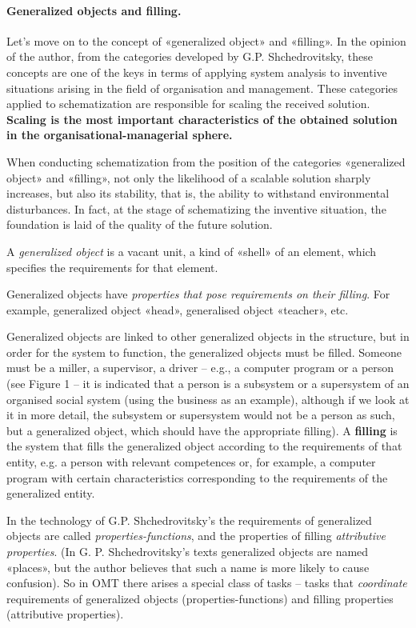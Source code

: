 \documentclass[11pt,a4paper]{book}
\begin{document}
\paragraph{Generalized objects and filling.}

Let's move on to the concept of «generalized object» and «filling». In the
opinion of the author, from the categories developed by G.P. Shchedrovitsky,
these concepts are one of the keys in terms of applying system analysis to
inventive situations arising in the field of organisation and management.
These categories applied to schematization are responsible for scaling the
received solution.  \textbf{Scaling is the most important characteristics of
  the obtained solution in the organisational-managerial sphere.}

When conducting schematization from the position of the categories
«generalized object» and «filling», not only the likelihood of a scalable
solution sharply increases, but also its stability, that is, the ability to
withstand environmental disturbances. In fact, at the stage of schematizing
the inventive situation, the foundation is laid of the quality of the future
solution.

A \emph{generalized object} is a vacant unit, a kind of «shell» of an element,
which specifies the requirements for that element.

Generalized objects have \emph{properties that pose requirements on their
  filling}. For example, generalized object «head», generalised object
«teacher», etc.

Generalized objects are linked to other generalized objects in the structure,
but in order for the system to function, the generalized objects must be
filled.  Someone must be a miller, a supervisor, a driver -- e.g., a computer
program or a person (see Figure 1 -- it is indicated that a person is a
subsystem or a supersystem of an organised social system (using the business
as an example), although if we look at it in more detail, the subsystem or
supersystem would not be a person as such, but a generalized object, which
should have the appropriate filling). A \textbf{filling} is the system that
fills the generalized object according to the requirements of that entity,
e.g. a person with relevant competences or, for example, a computer program
with certain characteristics corresponding to the requirements of the
generalized entity.

In the technology of G.P. Shchedrovitsky's the requirements of generalized
objects are called \emph{properties-functions}, and the properties of filling
\emph{attributive properties}.  (In G. P. Shchedrovitsky's texts generalized
objects are named «places», but the author believes that such a name is more
likely to cause confusion). So in OMT there arises a special class of tasks --
tasks that \emph{coordinate} requirements of generalized objects
(properties-functions) and filling properties (attributive properties).
\end{document}
